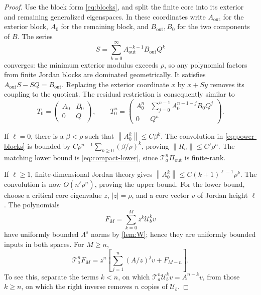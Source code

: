 \documentclass[11pt,a4paper]{article}
\numberwithin{equation}{section}
\theoremstyle{definition}
\theoremstyle{remark}
\newcommand{\Ta}{\mathcal T_a}
\newcommand{\Ub}{\mathcal U_b}
\newcommand{\norm}[1]{\left\lVert#1\right\rVert}
\begin{document}
\begin{proof}
Use the block form \eqref{eq:blocks}, and split the finite core into its
exterior and remaining generalized eigenspaces. In these coordinates
write $A_{\mathrm{out}}$ for the exterior block, $A_0$ for the
remaining block, and $B_{\mathrm{out}},B_0$ for the two components of
$B$. The series
\begin{equation}
 S=\sum_{k=0}^\infty A_{\mathrm{out}}^{-k-1}
 B_{\mathrm{out}}Q^k
 \label{eq:sylvester}
\end{equation}
converges: the minimum exterior modulus exceeds $\rho$, so any
polynomial factors from finite Jordan blocks are dominated geometrically.
It satisfies $A_{\mathrm{out}}S-SQ=B_{\mathrm{out}}$. Replacing the
exterior coordinate $x$ by $x+Sy$ removes its coupling to the quotient.
The residual restriction is consequently similar to
\begin{equation}
 T_0=\begin{pmatrix}A_0&B_0\\0&Q\end{pmatrix},\qquad
 T_0^n=\begin{pmatrix}
 A_0^n&\displaystyle\sum_{j=0}^{n-1}A_0^{n-1-j}B_0Q^j\\
 0&Q^n
 \end{pmatrix}.
 \label{eq:power-blocks}
\end{equation}

If $\ell=0$, there is a $\beta<\rho$ such that
$\norm{A_0^k}\le C\beta^k$. The convolution in
\eqref{eq:power-blocks} is bounded by
$C\rho^{n-1}\sum_{k\ge0}(\beta/\rho)^k$, proving
$\norm{R_n}\le C'\rho^n$. The matching lower bound is
\eqref{eq:compact-lower}, since $\Ta^n\Pi_{\mathrm{out}}$ is
finite-rank.

If $\ell\ge1$, finite-dimensional Jordan theory gives
$\norm{A_0^k}\le C(k+1)^{\ell-1}\rho^k$. The convolution is now
$O(n^\ell\rho^n)$, proving the upper bound.
For the lower bound, choose a critical core eigenvalue $z$, $|z|=\rho$,
and a core vector $v$ of Jordan height $\ell$. The polynomials
\begin{equation}
 F_M=\sum_{k=0}^M z^k\Ub^k v
 \label{eq:finite-critical-inputs}
\end{equation}
have uniformly bounded $\Lambda^s$ norms by \cref{lem:W}; hence they
are uniformly bounded inputs in both spaces. For $M\ge n$,
\begin{equation}
 \Ta^nF_M=z^n\left[
 \sum_{j=1}^n(A/z)^jv+F_{M-n}\right].
 \label{eq:critical-finite-iterate}
\end{equation}
To see this, separate the terms $k<n$, on which
$\Ta^n\Ub^kv=A^{n-k}v$, from those $k\ge n$, on which the right
inverse removes $n$ copies of $\Ub$.


\end{proof}
\end{document}
